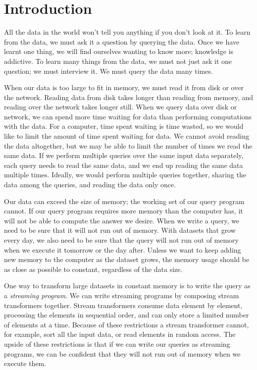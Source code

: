 \chapter{Introduction}
\label{chapter:introduction}


All the data in the world won't tell you anything if you don't look at it.
To learn from the data, we must ask it a question by querying the data.
Once we have learnt one thing, we will find ourselves wanting to know more; knowledge is addictive.
To learn many things from the data, we must not just ask it one question; we must interview it.
We must query the data many times.

When our data is too large to fit in memory, we must read it from disk or over the network.
Reading data from disk takes longer than reading from memory, and reading over the network takes longer still.
When we query data over disk or network, we can spend more time waiting for data than performing computations with the data.
For a computer, time spent waiting is time wasted, so we would like to limit the amount of time spent waiting for data.
We cannot avoid reading the data altogether, but we may be able to limit the number of times we read the same data.
If we perform multiple queries over the same input data separately, each query needs to read the same data, and we end up reading the same data multiple times.
Ideally, we would perform multiple queries together, sharing the data among the queries, and reading the data only once.

Our data can exceed the size of memory; the working set of our query program cannot.
If our query program requires more memory than the computer has, it will not be able to compute the answer we desire.
When we write a query, we need to be sure that it will not run out of memory.
With datasets that grow every day, we also need to be sure that the query will not run out of memory when we execute it tomorrow or the day after.
Unless we want to keep adding new memory to the computer as the dataset grows, the memory usage should be as close as possible to constant, regardless of the data size.

One way to transform large datasets in constant memory is to write the query as a \emph{streaming program}.
We can write streaming programs by composing stream transformers together.
Stream transformers consume data element by element, processing the elements in sequential order, and can only store a limited number of elements at a time.
Because of these restrictions a stream transformer cannot, for example, sort all the input data, or read elements in random access.
The upside of these restrictions is that if we can write our queries as streaming programs, we can be confident that they will not run out of memory when we execute them.

